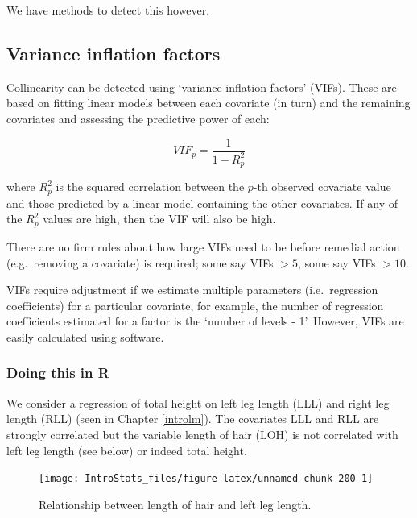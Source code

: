 \documentclass[
  oneside]{krantz}
\begin{document}
We have methods to detect this however.

\hypertarget{variance-inflation-factors}{%
\subsection{Variance inflation factors}\label{variance-inflation-factors}}

Collinearity can be detected using `variance inflation factors' (VIFs). These are based on fitting linear models between each covariate (in turn) and the remaining covariates and assessing the predictive power of each:

\begin{equation}
VIF_p=\frac{1}{1-R_p^2}
\end{equation}

where \(R^2_p\) is the squared correlation between the \(p\)-th observed covariate value and those predicted by a linear model containing the other covariates. If any of the \(R^2_p\) values are high, then the VIF will also be high.

There are no firm rules about how large VIFs need to be before remedial action (e.g.~removing a covariate) is required; some say VIFs \(> 5\), some say VIFs \(>10\).

VIFs require adjustment if we estimate multiple parameters (i.e.~regression coefficients) for a particular covariate, for example, the number of regression coefficients estimated for a factor is the `number of levels - 1'. However, VIFs are easily calculated using software.

\hypertarget{doing-this-in-r-25}{%
\subsubsection{Doing this in R}\label{doing-this-in-r-25}}

We consider a regression of total height on left leg length (LLL) and right leg length (RLL) (seen in Chapter \ref{introlm}). The covariates LLL and RLL are strongly correlated but the variable length of hair (LOH) is not correlated with left leg length (see below) or indeed total height.

\begin{figure}

{\centering \texttt{[image: IntroStats\_files/figure-latex/unnamed-chunk-200-1]} 

}

\caption{Relationship between length of hair and left leg length.}\label{fig:unnamed-chunk-200}
\end{figure}
\end{document}

